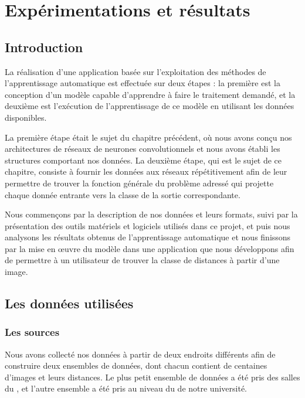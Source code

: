 \chapter{Expérimentations et résultats}

\section{Introduction}

La réalisation d'une application basée sur l'exploitation des méthodes de
l'apprentissage automatique est effectuée sur deux étapes : la première est
la conception d'un modèle capable d'apprendre à faire le traitement demandé, et
la deuxième est l'exécution de l'apprentissage de ce modèle en utilisant
les données disponibles.

La première étape était le sujet du chapitre précédent, où nous avons conçu nos
architectures de réseaux de neurones convolutionnels et nous avons établi les
structures comportant nos données. La deuxième étape, qui est le sujet de ce chapitre,
consiste à fournir les données aux réseaux répétitivement afin de leur permettre
de trouver la fonction générale du problème adressé qui projette chaque donnée
entrante vers la classe de la sortie correspondante.

Nous commençons par la description de nos données et leurs formats, suivi par
la présentation des outils matériels et logiciels utilisés dans ce projet, et puis
nous analysons les résultats obtenus de l'apprentissage automatique et nous
finissons par la mise en œuvre du modèle dans une application que nous développons
afin de permettre à un utilisateur de trouver la classe de distances à partir d'une
image.

\section{Les données utilisées}

\subsection{Les sources}

Nous avons collecté nos données à partir de deux endroits différents afin de
construire deux ensembles de données, dont chacun contient de centaines d'images
et leurs distances. Le plus petit ensemble de données a été
pris des salles du ,
et l'autre ensemble a été pris au niveau du  de
notre université.

